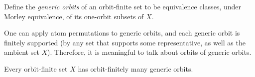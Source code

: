 \begin{definition}
      	Define the \emph{generic orbits} of an orbit-finite set to be equivalence classes, under Morley equivalence, of its one-orbit subsets of $X$. 
\end{definition}

One can apply atom permutations to generic orbits, and each generic orbit is finitely supported (by any set that supports some representative, as well as the ambient set $X$). Therefore, it is meaningful to talk about orbits of generic orbits. 



\begin{lemma}
	\label{lem:orbit-finitely-many-generic-orbits} Every orbit-finite set $X$ has orbit-finitely many generic orbits. 
\end{lemma}
